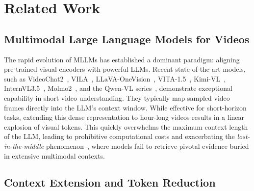 \section{Related Work}
\label{sec:related_work}

\subsection{Multimodal Large Language Models for Videos}
\label{sec:related_work:MLLMs}

The rapid evolution of MLLMs has established a dominant paradigm: aligning pre-trained visual encoders with powerful LLMs. Recent state-of-the-art models, such as VideoChat2~\cite{li2025videochat}, VILA~\cite{lin2024vila}, LLaVA-OneVision~\cite{li2024llava}, VITA-1.5~\cite{fu2025vita}, Kimi-VL~\cite{team2025kimi}, InternVL3.5~\cite{wang2025internvl3}, Molmo2~\cite{clark2026molmo2}, and the Qwen-VL series~\cite{bai2025qwen3},
%
demonstrate exceptional capability in short video understanding. They typically map sampled video frames directly into the LLM's context window. While effective for short-horizon tasks, extending this dense representation to hour-long videos results in a linear explosion of visual tokens. This quickly overwhelms the maximum context length of the LLM, leading to prohibitive computational costs and exacerbating the \emph{lost-in-the-middle} phenomenon~\cite{liu2024lost}, where models fail to retrieve pivotal evidence buried in extensive multimodal contexts.

\subsection{Context Extension and Token Reduction}
\label{sec:related_work:reduction}

